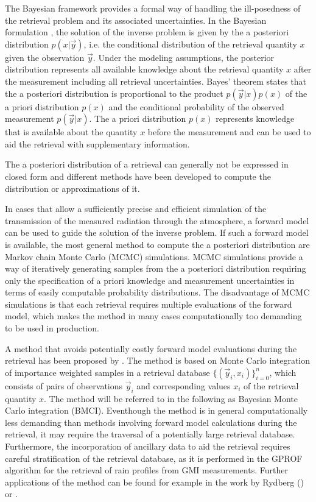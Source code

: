 \documentclass[journal abbreviation, manuscript]{copernicus}
\begin{document}
The Bayesian framework provides a formal way of handling the ill-posedness of
the retrieval problem and its associated uncertainties. In the Bayesian
formulation \citep{rodgers}, the solution of the inverse problem is given by the
a posteriori distribution $p(x | \vec{y})$, i.e. the conditional distribution of
the retrieval quantity $x$ given the observation $\vec{y}$. Under the modeling
assumptions, the posterior distribution represents all available knowledge about
the retrieval quantity $x$ after the measurement including all retrieval
uncertainties. Bayes' theorem states that the a posteriori distribution is
proportional to the product $p(\vec{y} | x)p(x)$ of the a priori distribution
$p(x)$ and the conditional probability of the observed measurement $p(\vec{y} |
x)$. The a priori distribution $p(x)$ represents knowledge that is available
about the quantity $x$ before the measurement and can be used to aid the
retrieval with supplementary information.

The a posteriori distribution of a retrieval can generally not be expressed in
closed form and different methods have been developed to compute the distribution
or approximations of it.

In cases that allow a sufficiently precise and efficient simulation of the
transmission of the measured radiation through the atmosphere, a forward model
can be used to guide the solution of the inverse problem. If such a forward
model is available, the most general method to compute the a posteriori
distribution are Markov chain Monte Carlo (MCMC) simulations. MCMC simulations
provide a way of iteratively generating samples from the a posteriori
distribution requiring only the specification of a priori knowledge and
measurement uncertainties in terms of easily computable probability
distributions. The disadvantage of MCMC simulations is that each retrieval
requires multiple evaluations of the forward model, which makes the method in
many cases computationally too demanding to be used in production.

A method that avoids potentially costly forward model evaluations during
the retrieval has been proposed by \cite{kummerow_1}. The method is based on
Monte Carlo integration of importance weighted samples in a retrieval database
$\{(\vec{y}_i, x_i)\}_{i = 0}^n$, which consists of pairs of observations $\vec{y}_i$
and corresponding values $x_i$ of the retrieval quantity $x$. The method will be
referred to in the following as Bayesian Monte Carlo integration (BMCI).
Eventhough the method is in general computationally less demanding than methods
involving forward model calculations during the retrieval, it may require the
traversal of a potentially large retrieval database. Furthermore, the
incorporation of ancillary data to aid the retrieval requires careful
stratification of the retrieval database, as it is performed in the GPROF
\citep{gprof} algorithm for the retrieval of rain profiles from GMI
measurements. Further applications of the method can be found for example in the
work by Rydberg (\citeyear{rydberg_2, rydberg_1}) or \cite{evans_2}.
\end{document}
